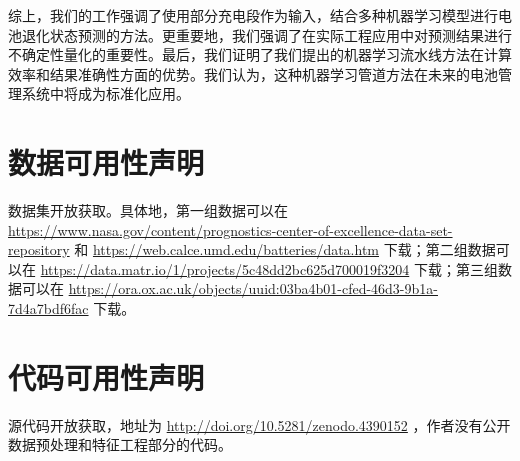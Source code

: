 \documentclass{article}
\begin{document}
综上，我们的工作强调了使用部分充电段作为输入，结合多种机器学习模型进行电池退化状态预测的方法。更重要地，我们强调了在实际工程应用中对预测结果进行不确定性量化的重要性。最后，我们证明了我们提出的机器学习流水线方法在计算效率和结果准确性方面的优势。我们认为，这种机器学习管道方法在未来的电池管理系统中将成为标准化应用。


\section{数据可用性声明}

数据集开放获取。具体地，第一组数据可以在 \href{https://www.nasa.gov/content/prognostics-center-of-excellence-data-set-repository}{https://www.nasa.gov/content/prognostics-center-of-excellence-data-set-repository} 和 \href{https://web.calce.umd.edu/batteries/data.htm}{https://web.calce.umd.edu/batteries/data.htm} 下载；第二组数据可以在 \href{https://data.matr.io/1/projects/5c48dd2bc625d700019f3204}{https://data.matr.io/1/projects/5c48dd2bc625d700019f3204} 下载；第三组数据可以在 \href{https://ora.ox.ac.uk/objects/uuid:03ba4b01-cfed-46d3-9b1a-7d4a7bdf6fac}{https://ora.ox.ac.uk/objects/uuid:03ba4b01-cfed-46d3-9b1a-7d4a7bdf6fac} 下载。

\section{代码可用性声明}

源代码开放获取，地址为 \href{http://doi.org/10.5281/zenodo.4390152}{http://doi.org/10.5281/zenodo.4390152} ，作者没有公开数据预处理和特征工程部分的代码。

\small


\end{document}
